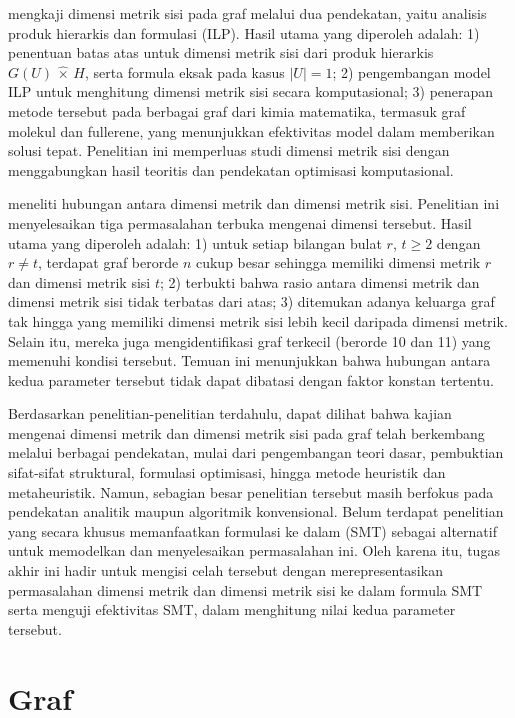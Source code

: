 \cite{klavzar2020} mengkaji dimensi metrik sisi pada graf melalui dua pendekatan, yaitu analisis produk hierarkis dan formulasi  (ILP). Hasil utama yang diperoleh adalah: 1) penentuan batas atas untuk dimensi metrik sisi dari produk hierarkis \(G(U) \,\widehat{\times}\, H\), serta formula eksak pada kasus \(|U| = 1\); 2) pengembangan model ILP untuk menghitung dimensi metrik sisi secara komputasional; 3) penerapan metode tersebut pada berbagai graf dari kimia matematika, termasuk graf molekul dan fullerene, yang menunjukkan efektivitas model dalam memberikan solusi tepat. Penelitian ini memperluas studi dimensi metrik sisi dengan menggabungkan hasil teoritis dan pendekatan optimisasi komputasional.

\cite{knor2021} meneliti hubungan antara dimensi metrik dan dimensi metrik sisi. Penelitian ini menyelesaikan tiga permasalahan terbuka mengenai dimensi tersebut. Hasil utama yang diperoleh adalah: 1) untuk setiap bilangan bulat \(r\), \(t \geq 2\) dengan \(r \neq t\), terdapat graf berorde \(n\) cukup besar sehingga memiliki dimensi metrik \(r\) dan dimensi metrik sisi \(t\); 2) terbukti bahwa rasio antara dimensi metrik dan dimensi metrik sisi tidak terbatas dari atas; 3) ditemukan adanya keluarga graf tak hingga yang memiliki dimensi metrik sisi lebih kecil daripada dimensi metrik. Selain itu, mereka juga mengidentifikasi graf terkecil (berorde 10 dan 11) yang memenuhi kondisi tersebut. Temuan ini menunjukkan bahwa hubungan antara kedua parameter tersebut tidak dapat dibatasi dengan faktor konstan tertentu.

Berdasarkan penelitian-penelitian terdahulu, dapat dilihat bahwa kajian mengenai dimensi metrik dan dimensi metrik sisi pada graf telah berkembang melalui berbagai pendekatan, mulai dari pengembangan teori dasar, pembuktian sifat-sifat struktural, formulasi optimisasi, hingga metode heuristik dan metaheuristik. Namun, sebagian besar penelitian tersebut masih berfokus pada pendekatan analitik maupun algoritmik konvensional. Belum terdapat penelitian yang secara khusus memanfaatkan formulasi ke dalam  (SMT) sebagai alternatif untuk memodelkan dan menyelesaikan permasalahan ini. Oleh karena itu, tugas akhir ini hadir untuk mengisi celah tersebut dengan merepresentasikan permasalahan dimensi metrik dan dimensi metrik sisi ke dalam formula SMT serta menguji efektivitas  SMT, dalam menghitung nilai kedua parameter tersebut.

\section{Graf}

